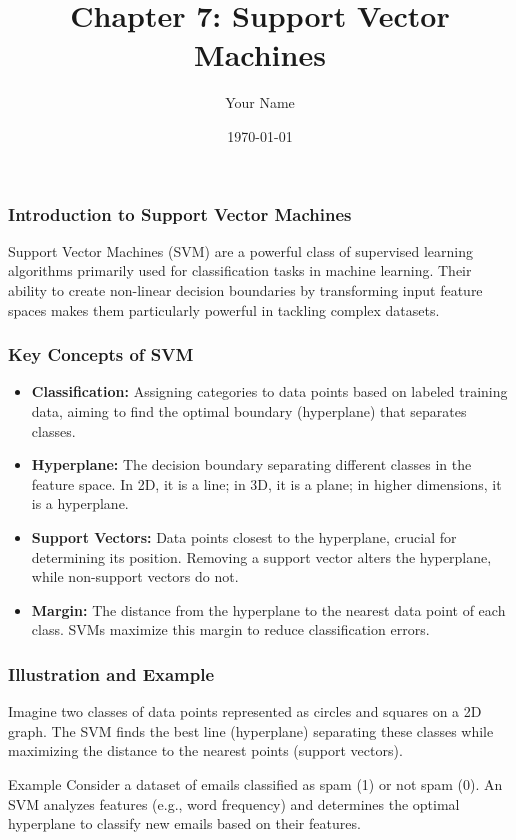 \documentclass{beamer}
\title{Chapter 7: Support Vector Machines}
\author{Your Name}
\institute{Your Institution}
\date{\today}
\begin{document}
\frame{\titlepage}

\begin{frame}[fragile]
    \frametitle{Introduction to Support Vector Machines}
    Support Vector Machines (SVM) are a powerful class of supervised learning algorithms primarily used for classification tasks in machine learning. 
    Their ability to create non-linear decision boundaries by transforming input feature spaces makes them particularly powerful in tackling complex datasets.
\end{frame}

\begin{frame}[fragile]
    \frametitle{Key Concepts of SVM}
    \begin{itemize}
        \item \textbf{Classification:} Assigning categories to data points based on labeled training data, aiming to find the optimal boundary (hyperplane) that separates classes.
        
        \item \textbf{Hyperplane:} The decision boundary separating different classes in the feature space. In 2D, it is a line; in 3D, it is a plane; in higher dimensions, it is a hyperplane.
        
        \item \textbf{Support Vectors:} Data points closest to the hyperplane, crucial for determining its position. Removing a support vector alters the hyperplane, while non-support vectors do not.
        
        \item \textbf{Margin:} The distance from the hyperplane to the nearest data point of each class. SVMs maximize this margin to reduce classification errors.
    \end{itemize}
\end{frame}

\begin{frame}[fragile]
    \frametitle{Illustration and Example}
    Imagine two classes of data points represented as circles and squares on a 2D graph. The SVM finds the best line (hyperplane) separating these classes while maximizing the distance to the nearest points (support vectors).

    \begin{block}{Example}
        Consider a dataset of emails classified as spam (1) or not spam (0). 
        An SVM analyzes features (e.g., word frequency) and determines the optimal hyperplane to classify new emails based on their features.
    \end{block}
\end{frame}
\end{document}
